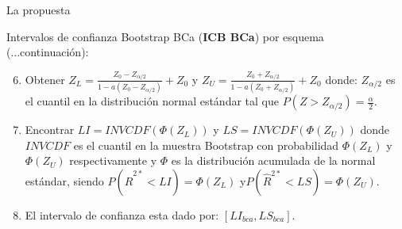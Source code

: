 \documentclass[serif, aspectratio=169]{beamer}
\begin{document}
\begin{frame}{La propuesta}
	
	
	Intervalos de confianza Bootstrap BCa (\textbf{ICB BCa}) por esquema (...continuación):
	
	\vspace{.3cm}
	
	\begin{enumerate}
		\setcounter{enumi}{5}
		
		\item Obtener {\large $Z_{L} = \frac{Z_{0} - Z_{\alpha/2}}{ 1- a ( Z_{0} - Z_{\alpha/2})} + Z_{0}  $}   y {\large $Z_{U} = \frac{Z_{0} + Z_{\alpha/2}}{ 1- a( Z_{0} + Z_{\alpha/2})} + Z_{0}  $}  donde: $Z_{\alpha /2}$ es el cuantil en la
		distribución normal estándar tal que $P(Z > Z_{\alpha / 2}) = \frac{\alpha}{2}$.
		
		
		\item Encontrar $LI = INVCDF( \Phi(Z_{L}))$ y $LS = INVCDF( \Phi(Z_{U}))$ donde $INVCDF$ es el cuantil en la muestra Bootstrap con probabilidad $ \Phi(Z_{L})$ y $ \Phi(Z_{U})$ respectivamente y $\Phi$ es la distribución acumulada de la normal estándar, siendo $P(\hat{R}^{2*} < LI) = \Phi(Z_{L})$ y$P(\hat{R}^{2*} < LS) = \Phi(Z_{U})$.
		
		\item El intervalo de confianza esta dado por: $[LI_{bca}, LS_{bca}]$.
	\end{enumerate}
\end{frame}
\end{document}
